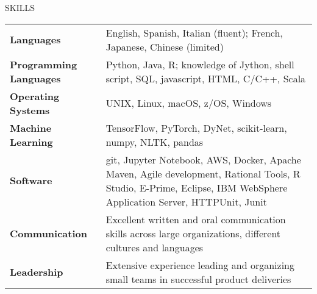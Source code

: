 \documentclass{resume} %
\begin{document}
\begin{rSection}{SKILLS}

\begin{tabular}{ @{} >{\bfseries}l @{\hspace{2ex}} p{11cm} }
Languages & English, Spanish, Italian (fluent); French, Japanese, Chinese (limited)\\ 
Programming Languages & Python, Java, R; knowledge of Jython, shell script, SQL, javascript, HTML, C/C++, Scala\\  
Operating Systems & UNIX, Linux, macOS, z/OS, Windows \\
Machine Learning & TensorFlow, PyTorch, DyNet, scikit-learn, numpy, NLTK, pandas \\ 
Software &  git, Jupyter Notebook, AWS, Docker, Apache Maven, Agile development, Rational Tools, R Studio, E-Prime, Eclipse, IBM WebSphere Application Server, HTTPUnit, Junit \\
Communication & Excellent written and oral communication skills across large organizations, different cultures and languages \\
Leadership & Extensive experience leading and organizing small teams in successful product deliveries
\end{tabular}
\end{rSection}
\end{document}

